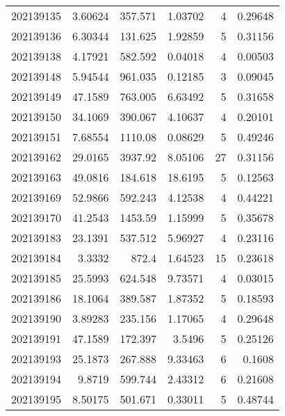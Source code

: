 \begin{tabular}{rrrrrr}
 202139135 &          3.60624 &      357.571  &            1.03702 &           4 & 0.29648 \\
 202139136 &          6.30344 &      131.625  &            1.92859 &           5 & 0.31156 \\
 202139138 &          4.17921 &      582.592  &            0.04018 &           4 & 0.00503 \\
 202139148 &          5.94544 &      961.035  &            0.12185 &           3 & 0.09045 \\
 202139149 &         47.1589  &      763.005  &            6.63492 &           5 & 0.31658 \\
 202139150 &         34.1069  &      390.067  &            4.10637 &           4 & 0.20101 \\
 202139151 &          7.68554 &     1110.08   &            0.08629 &           5 & 0.49246 \\
 202139162 &         29.0165  &     3937.92   &            8.05106 &          27 & 0.31156 \\
 202139163 &         49.0816  &      184.618  &           18.6195  &           5 & 0.12563 \\
 202139169 &         52.9866  &      592.243  &            4.12538 &           4 & 0.44221 \\
 202139170 &         41.2543  &     1453.59   &            1.15999 &           5 & 0.35678 \\
 202139183 &         23.1391  &      537.512  &            5.96927 &           4 & 0.23116 \\
 202139184 &          3.3332  &      872.4    &            1.64523 &          15 & 0.23618 \\
 202139185 &         25.5993  &      624.548  &            9.73571 &           4 & 0.03015 \\
 202139186 &         18.1064  &      389.587  &            1.87352 &           5 & 0.18593 \\
 202139190 &          3.89283 &      235.156  &            1.17065 &           4 & 0.29648 \\
 202139191 &         47.1589  &      172.397  &            3.5496  &           5 & 0.25126 \\
 202139193 &         25.1873  &      267.888  &            9.33463 &           6 & 0.1608  \\
 202139194 &          9.8719  &      599.744  &            2.43312 &           6 & 0.21608 \\
 202139195 &          8.50175 &      501.671  &            0.33011 &           5 & 0.48744 \\

\end{tabular}
